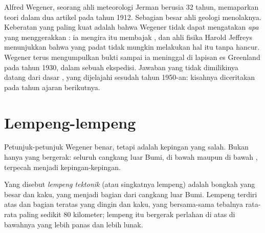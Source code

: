 \begin{history}
Alfred Wegener, seorang ahli meteorologi Jerman berusia 32 tahun,
memaparkan teori  dalam dua artikel pada tahun 1912.
Sebagian besar ahli geologi menolaknya. Keberatan yang paling kuat adalah
bahwa Wegener tidak dapat mengatakan \emph{apa} yang menggerakkan :
ia mengira  itu membajak  , dan ahli fisika
Harold Jeffreys menunjukkan bahwa  yang padat tidak mungkin melakukan
hal itu tanpa hancur. Wegener terus mengumpulkan bukti sampai ia meninggal
di lapisan es Greenland pada tahun 1930, dalam sebuah ekspedisi. Jawaban
yang tidak dimilikinya datang dari dasar , yang dijelajahi sesudah
tahun 1950-an: kisahnya diceritakan pada tahun ajaran berikutnya.
\end{history}

\section{Lempeng-lempeng}

Petunjuk-petunjuk Wegener benar, tetapi  adalah kepingan yang
salah. Bukan hanya  yang bergerak: seluruh cangkang luar Bumi, di
bawah  maupun di bawah , terpecah menjadi kepingan-kepingan.

\begin{definition}\label{def:g7:plate-tectonics:plate}
Yang disebut \emph{lempeng tektonik} (atau singkatnya
lempeng) adalah bongkah  yang besar dan kaku, yang menjadi bagian
dari cangkang luar Bumi. Lempeng terdiri atas  dan bagian teratas
 yang dingin dan kaku, yang bersama-sama tebalnya rata-rata paling
sedikit 80 kilometer; lempeng itu bergerak perlahan di atas  di
bawahnya yang lebih panas dan lebih lunak.
\end{definition}

